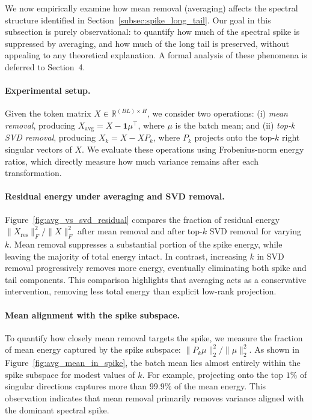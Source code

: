 We now empirically examine how mean removal (averaging) affects the spectral
structure identified in Section~\ref{subsec:spike_long_tail}.
Our goal in this subsection is purely observational: to quantify how much of the
spectral spike is suppressed by averaging, and how much of the long tail is
preserved, without appealing to any theoretical explanation.
A formal analysis of these phenomena is deferred to Section~4.

\paragraph{Experimental setup.}
Given the token matrix $X \in \mathbb{R}^{(BL)\times H}$, we consider two
operations:
(i) \emph{mean removal}, producing
$X_{\mathrm{avg}} = X - \mathbf{1}\mu^\top$, where $\mu$ is the batch mean; and
(ii) \emph{top-$k$ SVD removal}, producing
$X_k = X - X P_k$, where $P_k$ projects onto the top-$k$ right singular vectors
of $X$.
We evaluate these operations using Frobenius-norm energy ratios, which directly
measure how much variance remains after each transformation.

\paragraph{Residual energy under averaging and SVD removal.}
Figure~\ref{fig:avg_vs_svd_residual} compares the fraction of residual energy
$\|X_{\mathrm{res}}\|_F^2 / \|X\|_F^2$ after mean removal and after top-$k$ SVD
removal for varying $k$.
Mean removal suppresses a substantial portion of the spike energy, while leaving
the majority of total energy intact.
In contrast, increasing $k$ in SVD removal progressively removes more energy,
eventually eliminating both spike and tail components.
This comparison highlights that averaging acts as a conservative intervention,
removing less total energy than explicit low-rank projection.

\paragraph{Mean alignment with the spike subspace.}
To quantify how closely mean removal targets the spike, we measure the fraction
of mean energy captured by the spike subspace:
$\|P_k \mu\|_2^2 / \|\mu\|_2^2$.
As shown in Figure~\ref{fig:avg_mean_in_spike}, the batch mean lies almost entirely
within the spike subspace for modest values of $k$.
For example, projecting onto the top $1\%$ of singular directions captures more
than $99.9\%$ of the mean energy.
This observation indicates that mean removal primarily removes variance aligned
with the dominant spectral spike.

